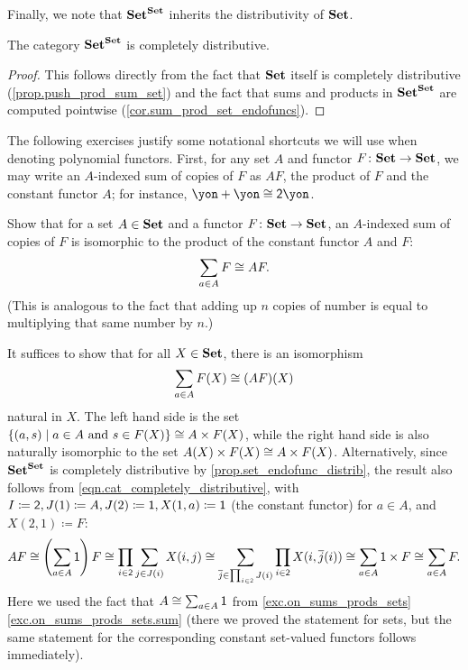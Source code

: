 \documentclass[Book-Poly]{subfiles}
\begin{document}
Finally, we note that $\mathbf{Set}^{\mathbf{Set}}$ inherits the distributivity of $\mathbf{Set}$.

\begin{proposition}\label{prop.set_endofunc_distrib}
    The category $\mathbf{Set}^{\mathbf{Set}}$ is completely distributive.
\end{proposition}
\begin{proof}
    This follows directly from the fact that $\mathbf{Set}$ itself is completely distributive (\cref{prop.push_prod_sum_set}) and the fact that sums and products in $\mathbf{Set}^{\mathbf{Set}}$ are computed pointwise (\cref{cor.sum_prod_set_endofuncs}).
\end{proof}

The following exercises justify some notational shortcuts we will use when denoting polynomial functors.
First, for any set $A$ and functor $F\colon\mathbf{Set}\to\mathbf{Set}$, we may write an $A$-indexed sum of copies of $F$ as $AF$, the product of $F$ and the constant functor $A$; for instance, $\yon+\yon\iso\2\yon$.

\begin{exercise} \label{exc.repeated_sum_is_product}
    Show that for a set $A\in\mathbf{Set}$ and a functor $F\colon\mathbf{Set}\to\mathbf{Set}$, an $A$-indexed sum of copies of $F$ is isomorphic to the product of the constant functor $A$ and $F$:
    \[
    \sum_{a \in A}F\cong AF.
    \]
    (This is analogous to the fact that adding up $n$ copies of number is equal to multiplying that same number by $n$.)
    \begin{solution}
        It suffices to show that for all $X\in\mathbf{Set}$, there is an isomorphism
        \[
        \sum_{a\in A}F(X)\cong(AF)(X)
        \]
        natural in $X$.
        The left hand side is the set $\{(a,s)\mid a\in A\text{ and }s\in F(X)\} \cong A \times F(X)$, while the right hand side is also naturally isomorphic to the set $A(X)\times F(X)\cong A\times F(X)$.
        Alternatively, since $\mathbf{Set}^{\mathbf{Set}}$ is completely distributive by \cref{prop.set_endofunc_distrib}, the result also follows from \eqref{eqn.cat_completely_distributive}, with $I\coloneqq\textsf{2}, J(1)\coloneqq A, J(2)\coloneqq\textsf{1}, X(1,a)\coloneqq\textsf{1}$ (the constant functor) for $a\in A$, and $X(2,1)\coloneqq F$:
        \[
        AF \cong
        \left(\sum_{a\in A}\textsf{1}\right)F \cong
        \prod_{i\in\textsf{2}}\sum_{j\in J(i)}X(i,j)
        \cong
        \sum_{\overline{j}\in\prod_{i\in\textsf{2}}J(i)}\prod_{i\in\textsf{2}}X(i,\overline{j}(i))
        \cong
        \sum_{a\in A}\textsf{1}\times F
        \cong
        \sum_{a\in A}F.
        \]
        Here we used the fact that $A\cong\sum_{a\in A}\textsf{1}$ from \cref{exc.on_sums_prods_sets} \cref{exc.on_sums_prods_sets.sum} (there we proved the statement for sets, but the same statement for the corresponding constant set-valued functors follows immediately).
    \end{solution}
\end{exercise}
\end{document}
